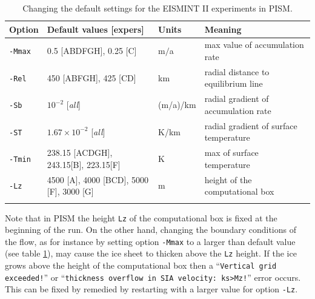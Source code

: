 \documentclass[11pt,final]{amsart}
\begin{document}
\begin{table}[h]
\caption{Changing the default settings for the EISMINT II experiments in PISM.}\label{tab:eisIIoptions}
\small
\begin{tabular}{@{}llll}\hline
\textbf{Option} & \textbf{Default values [expers]} & \textbf{Units} & \textbf{Meaning} \\ \hline
\verb|-Mmax| & 0.5 [ABDFGH], 0.25 [C] & m$/$a & max value of accumulation rate \\
\verb|-Rel| & 450 [ABFGH], 425 [CD] & km & radial distance to equilibrium line \\
\verb|-Sb| & $10^{-2}$ [\emph{all}] & (m/a)/km & radial gradient of accumulation rate \\
\verb|-ST| & $1.67 \times 10^{-2}$ [\emph{all}] & K/km & radial gradient of surface temperature\\
\verb|-Tmin| & 238.15 [ACDGH], 243.15[B], 223.15[F] & K & max of surface temperature \\ \hline
\verb|-Lz| & 4500 [A], 4000 [BCD], 5000 [F], 3000 [G] & m & height of the computational box \\
\hline\normalsize
\end{tabular}\end{table}

Note that in PISM the height \verb|Lz| of the computational box is fixed at the beginning of the run.  On the other hand, changing the boundary conditions of the flow, as for instance by setting option \verb|-Mmax| to a larger than default value (see table \ref{tab:eisIIoptions}), may cause the ice sheet to thicken above the \verb|Lz| height.  If the ice grows above the height of the computational box then a ``\verb|Vertical grid exceeded!|'' or ``\verb|thickness overflow in SIA velocity: ks>Mz!|'' error occurs.  This can be fixed by remedied by restarting with a larger value for option \verb|-Lz|.
\end{document}

